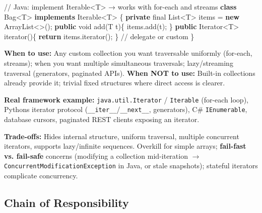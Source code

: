 \documentclass[11pt]{article}
\newenvironment{Shaded}{\begin{snugshade}}{\end{snugshade}}
\newcommand{\BuiltInTok}[1]{\textcolor[rgb]{0.50,0.55,0.55}{#1}}
\newcommand{\CommentTok}[1]{\textcolor[rgb]{0.48,0.49,0.49}{#1}}
\newcommand{\ControlFlowTok}[1]{\textcolor[rgb]{0.99,0.74,0.29}{\textbf{#1}}}
\newcommand{\DataTypeTok}[1]{\textcolor[rgb]{0.16,0.50,0.73}{#1}}
\newcommand{\FunctionTok}[1]{\textcolor[rgb]{0.56,0.27,0.68}{#1}}
\newcommand{\KeywordTok}[1]{\textcolor[rgb]{0.81,0.81,0.76}{\textbf{#1}}}
\newcommand{\NormalTok}[1]{\textcolor[rgb]{0.81,0.81,0.76}{#1}}
\newcommand{\OperatorTok}[1]{\textcolor[rgb]{0.81,0.81,0.76}{#1}}
\begin{document}

\begin{Shaded}
\begin{Highlighting}[]
\CommentTok{// Java: implement Iterable\textless{}T\textgreater{} → works with for{-}each and streams}
\KeywordTok{class}\NormalTok{ Bag}\OperatorTok{\textless{}}\NormalTok{T}\OperatorTok{\textgreater{}} \KeywordTok{implements} \BuiltInTok{Iterable}\OperatorTok{\textless{}}\NormalTok{T}\OperatorTok{\textgreater{}} \OperatorTok{\{}
    \KeywordTok{private} \DataTypeTok{final} \BuiltInTok{List}\OperatorTok{\textless{}}\NormalTok{T}\OperatorTok{\textgreater{}}\NormalTok{ items }\OperatorTok{=} \KeywordTok{new} \BuiltInTok{ArrayList}\OperatorTok{\textless{}\textgreater{}();}
    \KeywordTok{public} \DataTypeTok{void} \FunctionTok{add}\OperatorTok{(}\NormalTok{T t}\OperatorTok{)\{}\NormalTok{ items}\OperatorTok{.}\FunctionTok{add}\OperatorTok{(}\NormalTok{t}\OperatorTok{);} \OperatorTok{\}}
    \KeywordTok{public} \BuiltInTok{Iterator}\OperatorTok{\textless{}}\NormalTok{T}\OperatorTok{\textgreater{}} \FunctionTok{iterator}\OperatorTok{()\{} \ControlFlowTok{return}\NormalTok{ items}\OperatorTok{.}\FunctionTok{iterator}\OperatorTok{();} \OperatorTok{\}}  \CommentTok{// delegate or custom}
\OperatorTok{\}}
\end{Highlighting}
\end{Shaded}

\textbf{When to use:} Any custom collection you want traversable uniformly (for-each, streams); when you want multiple simultaneous traversals; lazy/streaming traversal (generators, paginated APIs). \textbf{When NOT to use:} Built-in collections already provide it; trivial fixed structures where direct access is clearer.

\textbf{Real framework example:} \texttt{java.util.Iterator} / \texttt{Iterable} (for-each loop), Python\textquotesingle s iterator protocol (\texttt{\_\_iter\_\_}/\texttt{\_\_next\_\_}, generators), C\# \texttt{IEnumerable}, database cursors, paginated REST clients exposing an iterator.

\textbf{Trade-offs:} Hides internal structure, uniform traversal, multiple concurrent iterators, supports lazy/infinite sequences. Overkill for simple arrays; \textbf{fail-fast vs. fail-safe} concerns (modifying a collection mid-iteration \(\rightarrow\) \texttt{ConcurrentModificationException} in Java, or stale snapshots); stateful iterators complicate concurrency.

\subsection{Chain of Responsibility}\label{chain-of-responsibility}
\end{document}
